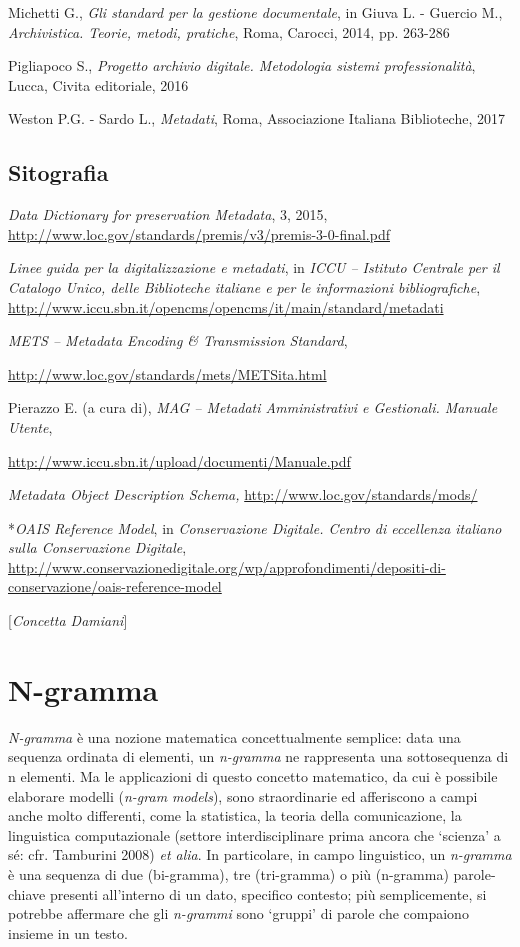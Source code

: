 {{Michetti G., \emph{Gli standard per la gestione documentale}, in Giuva
L. - Guercio M., \emph{Archivistica. Teorie, metodi, pratiche}, Roma,
Carocci, 2014, pp. 263-286

Pigliapoco S., \emph{Progetto archivio digitale. Metodologia sistemi
professionalità}, Lucca, Civita editoriale, 2016

Weston P.G. - Sardo L., \emph{Metadati}, Roma, Associazione Italiana
Biblioteche, 2017
}

\section*{Sitografia}
{\parindent0pt 
\emph{Data Dictionary for preservation Metadata}, 3, 2015,
\url{http://www.loc.gov/standards/premis/v3/premis-3-0-final.pdf}

\emph{Linee guida per la digitalizzazione e metadati}, in \emph{ICCU --
Istituto Centrale per il Catalogo Unico, delle Biblioteche italiane e
per le informazioni bibliografiche},
\url{http://www.iccu.sbn.it/opencms/opencms/it/main/standard/metadati}
}

\emph{METS -- Metadata Encoding \& Transmission Standard},

\url{http://www.loc.gov/standards/mets/METSita.html}

Pierazzo E. (a cura di), \emph{MAG -- Metadati Amministrativi e
Gestionali. Manuale Utente},

\url{http://www.iccu.sbn.it/upload/documenti/Manuale.pdf}

\emph{Metadata Object Description Schema,}
\url{http://www.loc.gov/standards/mods/}

*\emph{OAIS Reference Model}, in \emph{Conservazione Digitale. Centro di
eccellenza italiano sulla Conservazione Digitale},
\url{http://www.conservazionedigitale.org/wp/approfondimenti/depositi-di-conservazione/oais-reference-model}
}

\hrulefill 

{[}\emph{Concetta Damiani}{]}





\chapter{N-gramma}

\emph{N-gramma} è una nozione matematica concettualmente semplice: data
una sequenza ordinata di elementi, un \emph{n-gramma} ne rappresenta una
sottosequenza di n elementi. Ma le applicazioni di questo concetto
matematico, da cui è possibile elaborare modelli (\emph{n-gram models}),
sono straordinarie ed afferiscono a campi anche molto differenti, come
la statistica, la teoria della comunicazione, la linguistica
computazionale (settore interdisciplinare prima ancora che `scienza' a
sé: cfr. Tamburini 2008) \emph{et alia}. In particolare, in campo
linguistico, un \emph{n-gramma} è una sequenza di due (bi-gramma), tre
(tri-gramma) o più (n-gramma) parole-chiave presenti all'interno di un
dato, specifico contesto; più semplicemente, si potrebbe affermare che
gli \emph{n-grammi} sono `gruppi' di parole che compaiono insieme in un
testo.

